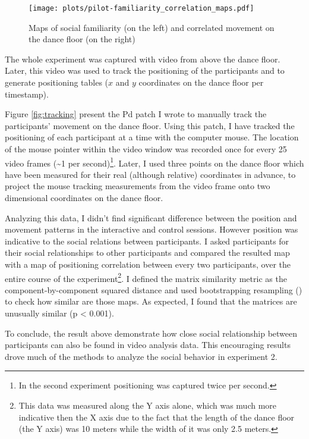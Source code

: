 \documentclass[a4paper,11pt]{article}
\begin{document}
{\begin{figure}[!htb]
    \centering
    \texttt{[image: plots/pilot-familiarity\_correlation\_maps.pdf]}
    \caption{Maps of social familiarity (on the left) and correlated movement on the dance floor (on the right)}\label{plot:pilot-familiarity_correlation_maps}
\end{figure}

The whole experiment was captured with video from above the dance floor.
Later, this video was used to track the positioning of the participants and to generate positioning tables ($x$ and $y$ coordinates on the dance floor per timestamp).

Figure \ref{fig:tracking} present the Pd patch I wrote to manually track the participants' movement on the dance floor.
Using this patch, I have tracked the positioning of each participant at a time with the computer mouse.
The location of the mouse pointer within the video window was recorded once for every 25 video frames (\textasciitilde{}1 per second)\footnote{In the second experiment positioning was captured twice per second.}.
Later, I used three points on the dance floor which have been measured for their real (although relative) coordinates in advance, to project the mouse tracking measurements from the video frame onto two dimensional coordinates on the dance floor.

Analyzing this data, I didn't find significant difference between the position and movement patterns in the interactive and control sessions.
However position was indicative to the social relations between participants.
I asked participants for their social relationships to other participants and compared the resulted map with a map of positioning correlation between every two participants, over the entire course of the experiment\footnote{This data was measured along the Y axis alone, which was much more indicative then the X axis due to the fact that the length of the dance floor (the Y axis) was 10 meters while the width of it was only 2.5 meters.}.
I defined the matrix similarity metric as the component-by-component squared distance and used bootstrapping resampling (\cite{good2006permutation}) to check how similar are those maps.
As expected, I found that the matrices are unusually similar (p \textless{} 0.001).

To conclude, the result above demonstrate how close social relationship between participants can also be found in video analysis data.
This encouraging results drove much of the methods to analyze the social behavior in experiment 2.

}
\end{document}
